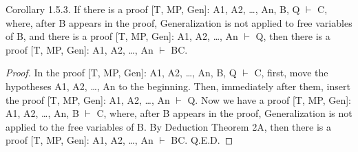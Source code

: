 Corollary 1.5.3. If there is a proof [T, MP, Gen]: A1, A2, \ldots , An, B, Q \(\vdash\) C, where, after B appears in the
proof, Generalization is not applied to free variables of B, and there is a proof [T, MP, Gen]: A1, A2, \ldots ,
An \(\vdash\) Q, then there is a proof [T, MP, Gen]: A1, A2, \ldots , An \(\vdash\) B\IMPLIES C.

\begin{proof}
In the proof [T, MP, Gen]: A1, A2, \ldots , An, B, Q \(\vdash\) C, first, move the hypotheses A1, A2, \ldots , An to the
beginning. Then, immediately after them, insert the proof [T, MP, Gen]: A1, A2, \ldots , An \(\vdash\) Q. Now we have
a proof [T, MP, Gen]: A1, A2, \ldots , An, B \(\vdash\) C, where, after B appears in the proof, Generalization is not
applied to the free variables of B. By Deduction Theorem 2A, then there is a proof [T, MP, Gen]: A1,
A2, \ldots , An \(\vdash\) B\IMPLIES C. Q.E.D.
\end{proof}

